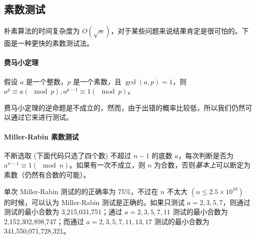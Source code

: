 \subsection{素数测试}
	朴素算法的时间复杂度为 $O({\sqrt{n}})$，对于某些问题来说结果肯定是很可怕的。下面是一种更快的素数测试法。
	
	\paragraph{费马小定理} 假设 $a$ 是一个整数，$p$ 是一个素数，且 $\gcd(a,p)=1$，则 $a^{p}\equiv a(\mod p),a^{{p-1}}\equiv 1(\mod p)$。
	
	费马小定理的逆命题是不成立的，然而，由于出错的概率比较低，所以我们仍然可以通过它来进行测试。
	
	\paragraph{Miller-Rabin 素数测试} 不断选取 (下面代码只选了四个数) 不超过 $n-1$ 的底数 $a$，每次判断是否为 $a^{{n-1}}\equiv 1(\mod n)$。如果有一次不成立，则 $n$ 为合数，否则\emph{基本上}可以断定为素数（仍然有合数的可能）。
	
	
	
	单次 Miller-Rabin 测试的的正确率为 75\%，不过在 $n$ 不太大 $(n\leqslant 2.5\times 10^{{10}})$ 的时候，可以认为 Miller-Rabin 测试是正确的。如果只测试 $a=2,3,5,7$，则通过测试的最小合数为 3,215,031,751；通过 $a=2,3,5,7,11$ 测试的最小合数为 2,152,302,898,747；而通过 $a=2,3,5,7,11,13,17$ 测试的最小合数为 341,550,071,728,321。